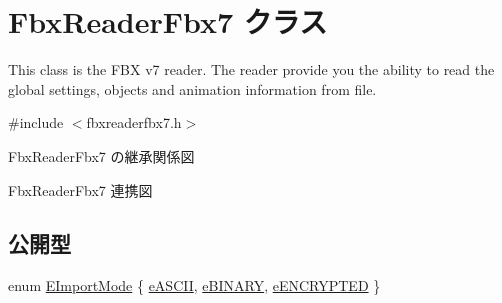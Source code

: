 \hypertarget{class_fbx_reader_fbx7}{}\section{Fbx\+Reader\+Fbx7 クラス}
\label{class_fbx_reader_fbx7}


This class is the F\+BX v7 reader. The reader provide you the ability to read the global settings, objects and animation information from file.  




{\ttfamily \#include $<$fbxreaderfbx7.\+h$>$}



Fbx\+Reader\+Fbx7 の継承関係図


Fbx\+Reader\+Fbx7 連携図
\subsection*{公開型}
\begin{DoxyCompactItemize}
\item 
enum \hyperlink{class_fbx_reader_fbx7_adac979509eca2b6dd882c24364e04a3a}{E\+Import\+Mode} \{ \hyperlink{class_fbx_reader_fbx7_adac979509eca2b6dd882c24364e04a3aa69cf32fabf9db79fd099956720a54256}{e\+A\+S\+C\+II}, 
\hyperlink{class_fbx_reader_fbx7_adac979509eca2b6dd882c24364e04a3aa701fc662c04bb2b80560887a21c55ae6}{e\+B\+I\+N\+A\+RY}, 
\hyperlink{class_fbx_reader_fbx7_adac979509eca2b6dd882c24364e04a3aa87a3b16cba8221426362c503c6c9cd65}{e\+E\+N\+C\+R\+Y\+P\+T\+ED}
 \}
\end{DoxyCompactItemize}
